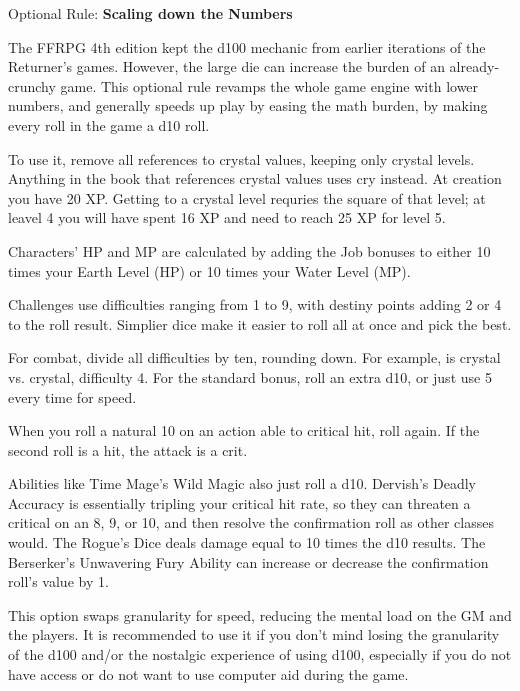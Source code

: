 \begin{multiboco}
    Optional Rule: \textbf{Scaling down the Numbers}\label{optrule:scaling}\pc%

    The FFRPG 4th edition kept the d100 mechanic from earlier iterations of the Returner’s games. However, the large die can increase the burden of an already-crunchy game. This optional rule revamps the whole game engine with lower numbers, and generally speeds up play by easing the math burden, by making every roll in the game a d10 roll.

    To use it, remove all references to crystal values, keeping only crystal levels. Anything in the book that references crystal values uses cry instead. At creation you have 20 XP\@. Getting to a crystal level requries the square of that level; at leavel 4 you will have spent 16 XP and need to reach 25 XP for level 5.

    Characters' HP and MP are calculated by adding the Job bonuses to either 10 times your Earth Level (HP) or 10 times your Water Level (MP).

    Challenges use difficulties ranging from 1 to 9, with destiny points adding 2 or 4 to the roll result. Simplier dice make it easier to roll all at once and pick the best.

    For combat, divide all difficulties by ten, rounding down. For example,  is crystal vs. crystal, difficulty 4. For the standard bonus, roll an extra d10, or just use 5 every time for speed.

    When you roll a natural 10 on an action able to critical hit, roll again. If the second roll is a hit, the attack is a crit.

    Abilities like Time Mage’s Wild Magic also just roll a d10. Dervish's Deadly Accuracy is essentially tripling your critical hit rate, so they can threaten a critical on an 8, 9, or 10, and then resolve the confirmation roll as other classes would. The Rogue’s Dice deals damage equal to 10 times the d10 results. The Berserker’s Unwavering Fury Ability can increase or decrease the confirmation roll’s value by 1.

    This option swaps granularity for speed, reducing the mental load on the GM and the players. It is recommended to use it if you don’t mind losing the granularity of the d100 and/or the nostalgic experience of using d100, especially if you do not have access or do not want to use computer aid during the game.
\end{multiboco}